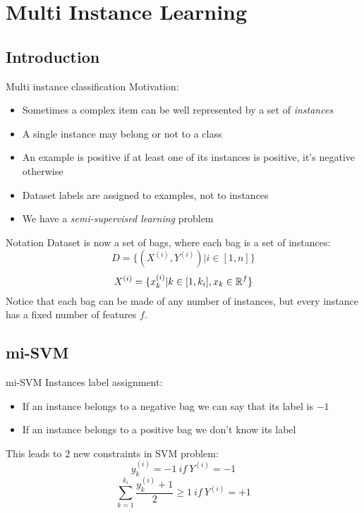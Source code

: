 \section{Multi Instance Learning}
 
\subsection{Introduction}
\begin{frame}{Multi instance classification}
	Motivation:
	\begin{itemize}\setlength\itemsep{1em}
		\item Sometimes a complex item can be well represented by a set of \textit{instances}
		\item A single instance may belong or not to a class
		\item An example is positive if at least one of its instances is positive, it's negative otherwise
		\item Dataset labels are assigned to examples, not to instances
		\item We have a \textit{semi-supervised learning} problem
	\end{itemize}
\end{frame}

\begin{frame}{Notation}
	Dataset is now a set of bags, where each bag is a set of instances:
	$$D = \{(X^{(i)}, Y^{(i)}) | i \in [1, n]\}$$
	$$X^{(i)} = \{x_k^{(i)} | k \in [1, k_i], x_k \in \mathbb{R}^f\}$$
	Notice that each bag can be made of any number of instances, but every instance has a fixed number of features $f$.
\end{frame}

\subsection{mi-SVM}
\begin{frame}{mi-SVM}
	Instances label assignment:
	\begin{itemize}\setlength\itemsep{1em}
		\item If an instance belongs to a negative bag we can say that its label is $-1$
		\item If an instance belongs to a positive bag we don't know its label
	\end{itemize}
	This leads to 2 new constraints in SVM problem:
	$$y_k^{(i)} = -1 \ if \ Y^{(i)} = -1$$
	$$\sum_{k = 1}^{k_i}\frac{y_k^{(i)} + 1}{2} \geq 1 \ if \ Y^{(i)} = +1$$
\end{frame}

